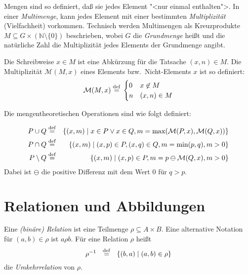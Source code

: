 Mengen sind so definiert, daß sie jedes Element "<nur einmal enthalten">. 
In einer \emph{Multimenge},
 kann jedes Element mit einer bestimmten
\emph{Multiplizität} (Vielfachheit) vorkommen.  Technisch werden
Multimengen als Kreuzprodukte $M \subseteq G \times (\mathbb{N}\setminus\{0\})$ beschrieben, wobei $G$
die \emph{Grundmenge} heißt und die natürliche Zahl die Multiplizität jedes Elements
der Grundmenge angibt.

Die Schreibweise $x\in M$ ist eine Abkürzung für
die Tatsache $(x,n)\in M$.  Die Multiplizität $\mathcal{M}(M, x)$ eines Elements bzw.\
Nicht-Elements $x$  ist so definiert:
%
\begin{displaymath}
  \mathcal{M}(M, x)\stackrel{\rm def}{=}{}
  \begin{cases}
    0 & x\not\in M\\
    n & (x, n)\in M
  \end{cases}
\end{displaymath}

Die mengentheoretischen Operationen sind wie folgt definiert:

\begin{eqnarray*}
  P\cup Q &\stackrel{\rm def}{=}& \{(x,m)\mid x\in P \vee x \in Q,
  m=\max(\mathcal{M}(P, x), \mathcal{M}(Q, x))\}\\
  P\cap Q &\stackrel{\rm def}{=}& \{(x,m)\mid(x,p)\in P, (x,q)\in Q, m=\min(p,q), m > 0\}\\
  P\setminus Q &\stackrel{\rm def}{=}& \{(x,m)\mid (x, p)\in P, m = p\ominus \mathcal{M}(Q, x), m > 0\}
\end{eqnarray*}
Dabei ist $\ominus$ die positive Differenz mit dem Wert $0$ für
$q>p$.

\section{Relationen und Abbildungen}
\label{sec:relationen}

\begin{definition} Eine \emph{(binäre) Relation}
ist eine Teilmenge $\rho \subseteq A \times B$.
Eine alternative Notation für $(a,b)\in\rho$ ist
$a\rho b$.
Für eine Relation $\rho$ heißt
\[ \rho^{-1}\ \ \stackrel{\rm def}{=}\ \ \{(b,a)\mid (a,b) \in \rho\}\]
die \emph{Umkehrrelation} 
von $\rho$. 
\end{definition}

